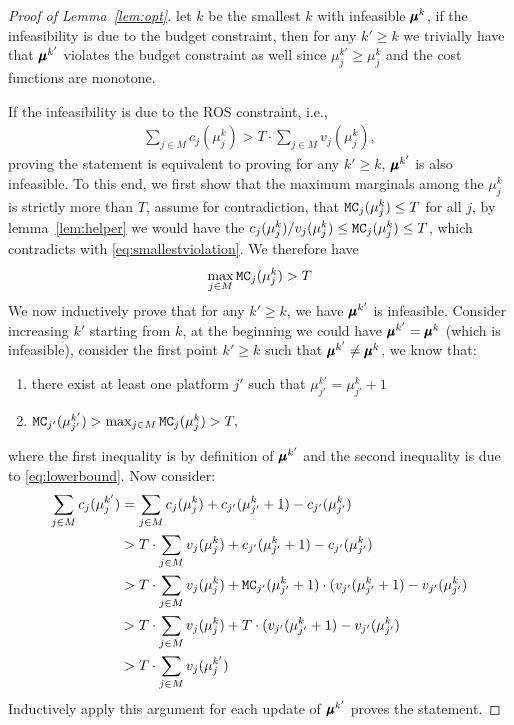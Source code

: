 \begin{proof}[Proof of Lemma~\ref{lem:opt}]
let $k$ be the smallest $k$ with infeasible $\pmb{\mu}^k$, if the infeasibility is due to the budget constraint, then for any $k' \geq k$ we trivially have that $\pmb{\mu}^{k'}$ violates the budget constraint as well since $\mu_j^{k'} \geq \mu_j^{k}$ and the cost functions are monotone.

If the infeasibility is due to the ROS constraint, i.e.,
\begin{align}\label{eq:smallestviolation}
   \sum_{j \in M}c_j(\mu_j^{k}) > T \cdot \sum_{j \in M}v_j(\mu_j^{k}),
\end{align}
proving the statement is equivalent to proving for any $k' \geq k$, $\pmb{\mu}^{k'}$ is also infeasible. To this end, we first show that the maximum marginals among the $\mu_j^{k}$ is strictly more than $T$, assume for contradiction, that $\texttt{MC}_j(\mu_j^{k}) \leq T$ for all $j$, by lemma~\ref{lem:helper} we  would have the $c_j(\mu_j^{k})/v_j(\mu_j^{k}) \leq \texttt{MC}_j(\mu_j^{k}) \leq T$, which contradicts with \eqref{eq:smallestviolation}. We therefore have
\begin{align}\label{eq:lowerbound}
    \max_{j \in M} \texttt{MC}_j(\mu_j^{k}) > T
\end{align}
We now inductively prove that for any $k' \geq k$, we have $\pmb{\mu}^{k'}$ is infeasible. Consider increasing $k'$ starting from $k$, at the beginning we could have $\pmb{\mu}^{k'} = \pmb{\mu}^k$ (which is infeasible), consider the first point $k' \geq k$ such that $\pmb{\mu}^{k'} \neq \pmb{\mu}^k$, we know that:
\begin{enumerate}
    \item there exist at least one platform $j'$ such that $\mu_{j'}^{k'} = \mu_{j'}^k+1$
    \item $\texttt{MC}_{j'}(\mu^{k'}_{j'}) > \max_{j \in M} \texttt{MC}_j(\mu_j^{k}) > T,$
 \end{enumerate}
where the first inequality is by definition of $\pmb{\mu}^{k'}$ and the second inequality is due to \eqref{eq:lowerbound}. Now consider:
{\allowdisplaybreaks\begin{align*}
    \sum_{j \in M}c_j(\mu_j^{k'}) &= \sum_{j \in M}c_j(\mu_j^{k}) + c_{j'}(\mu_{j'}^k+1) - c_{j'}(\mu_{j'}^k)\\
    & > T \cdot \sum_{j \in M}v_j(\mu_j^{k})+ c_{j'}(\mu_{j'}^k+1) - c_{j'}(\mu_{j'}^k)\\
    & > T \cdot \sum_{j \in M}v_j(\mu_j^{k})+ \texttt{MC}_{j'}(\mu^k_{j'}+1)\cdot (v_{j'}(\mu_{j'}^k+1) - v_{j'}(\mu_{j'}^k)\\
    &> T \cdot \sum_{j \in M}v_j(\mu_j^{k})+ T \cdot (v_{j'}(\mu_{j'}^k+1) - v_{j'}(\mu_{j'}^k)\\
    &> T \cdot \sum_{j \in M}v_j(\mu_j^{k'})
\end{align*}}
Inductively apply this argument for each update of $\pmb{\mu}^{k'}$ proves the statement.
\end{proof}


